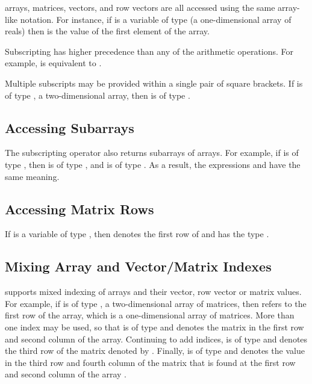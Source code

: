 \Stan arrays, matrices, vectors, and row vectors are all accessed
using the same array-like notation.  For instance, if  is a
variable of type  (a one-dimensional array of reals)
then  is the value of the first element of the
array.  

Subscripting has higher precedence than any of the arithmetic
operations.  For example,  is equivalent to
.  

Multiple subscripts may be provided within a single pair of square
brackets.  If  is of type , a two-dimensional
array, then  is of type .

\subsection{Accessing Subarrays}

The subscripting operator also returns subarrays of arrays.  For
example, if  is of type , then 
is of type , and  is of type
.  As a result, the expressions  and
 have the same meaning.  

\subsection{Accessing Matrix Rows}

If  is a variable of type , then
 denotes the first row of  and has the
type .  

\subsection{Mixing Array and Vector/Matrix Indexes}

\Stan supports mixed indexing of arrays and their vector, row vector
or matrix values.  For example, if  is of type
, a two-dimensional array of matrices, then
 refers to the first row of the array, which is a
one-dimensional array of matrices.  More than one index may be used,
so that  is of type  and denotes the matrix
in the first row and second column of the array.  Continuing to add
indices,  is of type  and denotes
the third row of the matrix denoted by .  Finally,
 is of type  and denotes the value in the
third row and fourth column of the matrix that is found at the first
row and second column of the array .

